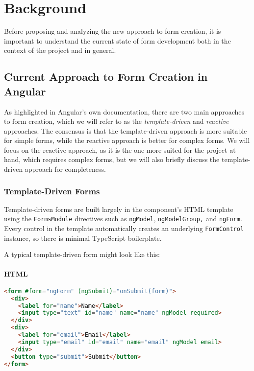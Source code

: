 \usepackage{listings}
\section{Background}

Before proposing and analyzing the new approach to form creation, it is important to understand the current state of
form development both in the context of the project and in general.

\subsection{Current Approach to Form Creation in Angular}

As highlighted in Angular's own documentation\cite{Angular:forms}, there are two main approaches to form creation, which
we will refer to as the \textit{template-driven} and \textit{reactive} approaches.
The consensus is that the template-driven approach is more suitable for simple forms, while the reactive approach is
better for complex forms.
We will focus on the reactive approach, as it is the one more suited for the project at hand, which requires complex
forms, but we will also briefly discuss the template-driven approach for completeness.

\subsubsection{Template-Driven Forms}

Template-driven forms are built largely in the component’s HTML template using the \texttt{FormsModule} directives such
as \texttt{ngModel}, \texttt{ngModelGroup,} and \texttt{ngForm}.
Every control in the template automatically creates an underlying \texttt{FormControl} instance, so there is minimal
TypeScript boilerplate.

A typical template-driven form might look like this:
\paragraph{HTML}
\begin{lstlisting}[language=HTML]
<form #form="ngForm" (ngSubmit)="onSubmit(form)">
  <div>
    <label for="name">Name</label>
    <input type="text" id="name" name="name" ngModel required>
  </div>
  <div>
    <label for="email">Email</label>
    <input type="email" id="email" name="email" ngModel email>
  </div>
  <button type="submit">Submit</button>
</form>
\end{lstlisting}

